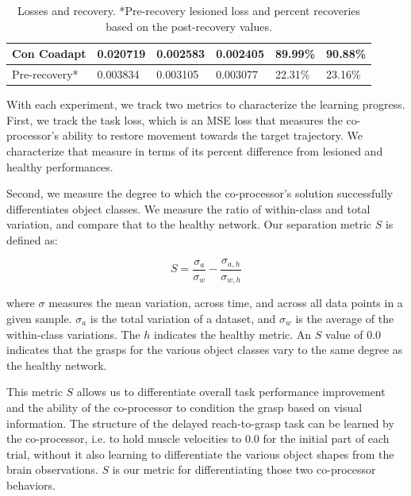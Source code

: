 \documentclass[12pt]{iopart}
\begin{document}
\begin{table}[]
\begin{tabular}{|l|l|l|l|l|l|}
Con Coadapt    & 0.020719                                                          & 0.002583                                                         & 0.002405                                                             & 89.99\%            & 90.88\%                                                          \\ \hline
Pre-recovery*  & 0.003834                                                          & 0.003105                                                         & 0.003077                                                             & 22.31\%            & 23.16\%                                                          \\ \hline
\end{tabular}
\caption{\label{tab:results}Losses and recovery. *Pre-recovery lesioned loss and percent recoveries based on the post-recovery values.}
\end{table}

With each experiment, we track two metrics to characterize the learning progress. First, we
track the task loss, which is an MSE loss that measures the co-processor's ability to restore
movement towards the target trajectory. We characterize that measure in terms of its percent
difference from lesioned and healthy performances.

Second, we measure the degree to which the co-processor's solution successfully
differentiates object classes. We measure the ratio of within-class and total variation,
and compare that to the healthy network. Our separation metric $S$ is defined as:

\begin{equation}
	S = \frac{\sigma_{a}}{\sigma_{w}} - \frac{\sigma_{a,h}}{\sigma_{w,h}}
\end{equation}

where $\sigma$ measures the mean variation, across time, and across all data points in
a given sample. $\sigma_{a}$ is the total variation of a dataset, and $\sigma_{w}$
is the average of the within-class variations. The $h$ indicates the healthy
metric. An $S$ value of 0.0 indicates that the grasps for the various object classes
vary to the same degree as the healthy network.

This metric $S$ allows us to differentiate overall task performance improvement
and the ability of the co-processor to condition the grasp based on visual information.
The structure of the delayed reach-to-grasp task can be learned by the co-processor,
i.e. to hold muscle velocities to 0.0 for the initial part of each trial, without it
also learning to differentiate the various object shapes from the brain observations.
$S$ is our metric for differentiating those two co-processor behaviors.
\end{document}
